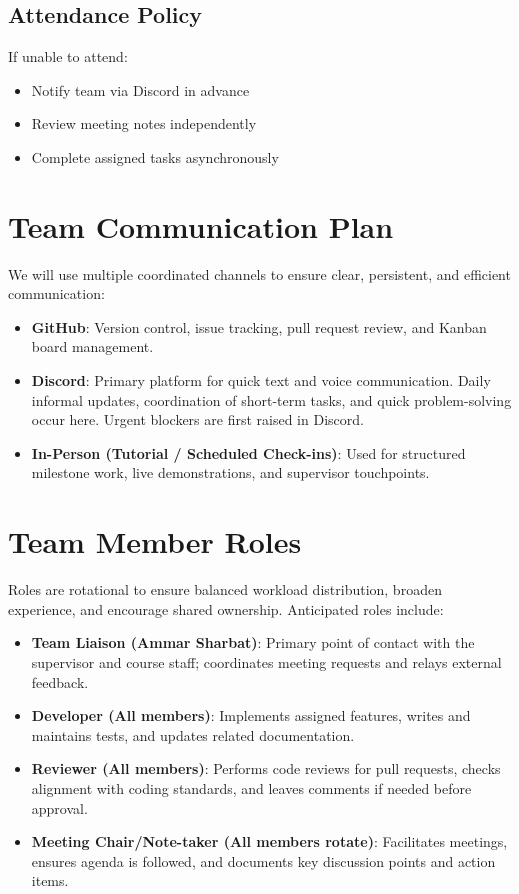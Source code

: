 \documentclass{article}
\begin{document}
\subsection*{Attendance Policy}
If unable to attend:
\begin{itemize}
  \item Notify team via Discord in advance
  \item Review meeting notes independently
  \item Complete assigned tasks asynchronously
\end{itemize}

\section{Team Communication Plan}
We will use multiple coordinated channels to ensure clear, persistent, and efficient communication:

\begin{itemize}
  \item \textbf{GitHub}: Version control, issue tracking, pull request review, and Kanban board management. 
  \item \textbf{Discord}: Primary platform for quick text and voice communication. Daily informal updates, coordination of short-term tasks, and quick problem-solving occur here. Urgent blockers are first raised in Discord.
  \item \textbf{In-Person (Tutorial / Scheduled Check-ins)}: Used for structured milestone work, live demonstrations, and supervisor touchpoints.
\end{itemize}

\section{Team Member Roles}
Roles are rotational to ensure balanced workload distribution, broaden experience, and encourage shared ownership. Anticipated roles include:

\begin{itemize}
  \item \textbf{Team Liaison (Ammar Sharbat)}: Primary point of contact with the supervisor and course staff; coordinates meeting requests and relays external feedback.
  \item \textbf{Developer (All members)}: Implements assigned features, writes and maintains tests, and updates related documentation.
  \item \textbf{Reviewer (All members)}: Performs code reviews for pull requests, checks alignment with coding standards, and leaves comments if needed before approval.
  \item \textbf{Meeting Chair/Note-taker (All members rotate)}: Facilitates meetings, ensures agenda is followed, and documents key discussion points and action items.
\end{itemize}
\end{document}

